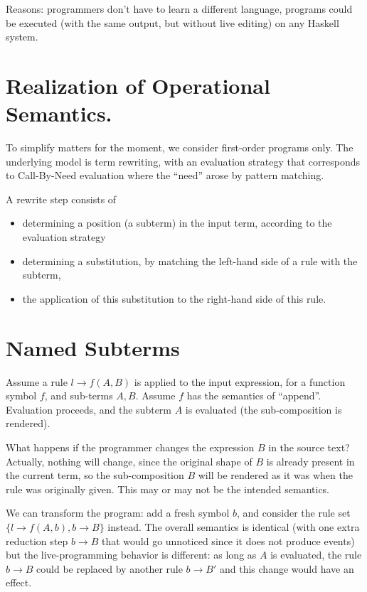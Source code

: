 \documentclass[a4paper]{easychair}
\begin{document}
Reasons: programmers don't have to learn a different language,
programs could be executed (with the same output, but without live editing) 
on any Haskell system.


\section{Realization of Operational Semantics.}

To simplify matters for the moment, we consider first-order programs only.
The underlying model is term rewriting,
with an evaluation strategy that corresponds 
to Call-By-Need evaluation where the ``need'' arose by pattern matching.

A rewrite step consists of 
\begin{itemize}
\item 
  determining a position (a subterm) in the input term,
  according to the evaluation strategy
\item
  determining a substitution,
  by matching the left-hand side of a rule
  with the subterm,
\item 
  the application of this substitution
  to the right-hand side of this rule.
\end{itemize}

\section{Named Subterms}

Assume a rule $l \to f(A,B)$ is applied to the input expression,
for a function symbol $f$, and sub-terms $A,B$.
Assume $f$ has the semantics of ``append''.
Evaluation proceeds, and the subterm $A$ is evaluated
(the sub-composition is rendered).

What happens if the programmer changes the expression $B$
in the source text? Actually, nothing will change, 
since the original shape of $B$ is already present
in the current term, so the sub-composition $B$ will
be rendered as it was when the rule was originally given.
This may or may not be the intended semantics.

We can transform the program: add a fresh symbol $b$,
and consider the rule set $\{l \to f(A, b), b\to B\}$ instead.
The overall semantics is identical (with one extra
reduction step $b\to B$ that would go unnoticed since it does not
produce events)
but the live-programming behavior is different:
as long as $A$ is evaluated, the rule $b\to B$
could be replaced by another rule $b\to B'$
and this change would have an effect.
\end{document}
